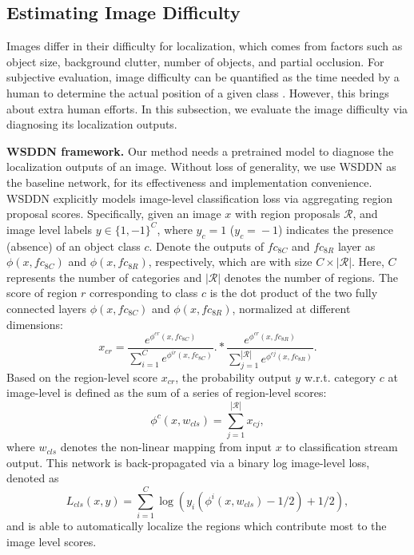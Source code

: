 \documentclass[10pt,twocolumn,letterpaper]{article}
\begin{document}
\subsection{Estimating Image Difficulty}
Images differ in their difficulty for localization, which comes from factors such as object size, background clutter, number of objects, and partial occlusion. For subjective evaluation, image difficulty can be quantified as the time needed by a human to determine the actual position of a given class \cite{tudor2016hard}. However, this brings about extra human efforts. In this subsection, we evaluate the image difficulty via diagnosing its localization outputs.

\textbf{WSDDN framework.} Our method needs a pretrained model to diagnose the localization outputs of an image. Without loss of generality, we use WSDDN \cite{Bilen_2016_CVPR} as the baseline network, for its effectiveness and implementation convenience. WSDDN explicitly models image-level classification loss via aggregating region proposal scores. Specifically, given an image $x$ with region proposals $\mathcal{R}$, and image level labels $y\in\{1,-1\}^C$, where $y_c\!=\!1$ ($y_c\!=\!-1$) indicates the presence (absence) of an object class $c$. Denote the outputs of $fc_{8C}$ and $fc_{8R}$ layer as $\phi(x, fc_{8C})$ and $\phi(x, fc_{8R})$, respectively, which are with size $C \times |\mathcal{R}|$. Here, $C$ represents the number of categories and $|\mathcal{R}|$ denotes the number of regions. The score of region $r$ corresponding to class $c$ is the dot product of the two fully connected layers $\phi(x, fc_{8C})$ and $\phi(x, fc_{8R})$, normalized at different dimensions:
\begin{equation}\label{region_score}
 x_{cr} = \frac{e^{\phi^{cr}(x,fc_{8C})}}{\sum_{i=1}^{C}e^{\phi^{ir}(x,fc_{8C})}} .*\frac{e^{\phi^{cr}(x,fc_{8R})}}{\sum_{j=1}^{|\mathcal{R}|}e^{\phi^{cj}(x,fc_{8R})}}.
\end{equation}
Based on the region-level score $x_{cr}$, the probability output $y$ w.r.t. category $c$ at image-level is defined as the sum of a series of region-level scores:
\begin{equation}\label{image-prob}
 \phi^c(x,w_{cls}) = \sum_{j=1}^{|\mathcal{R}|}x_{cj},
\end{equation}
where $w_{cls}$ denotes the non-linear mapping from input $x$ to classification stream output. This network is back-propagated via a binary log image-level loss, denoted as
\begin{equation}\label{binary-log}
L_{cls}(x,y)= \sum_{i=1}^C\log(y_i(\phi^i(x,w_{cls})-1/2)+1/2),
\end{equation}
and is able to automatically localize the regions which contribute most to the image level scores.
\end{document}
